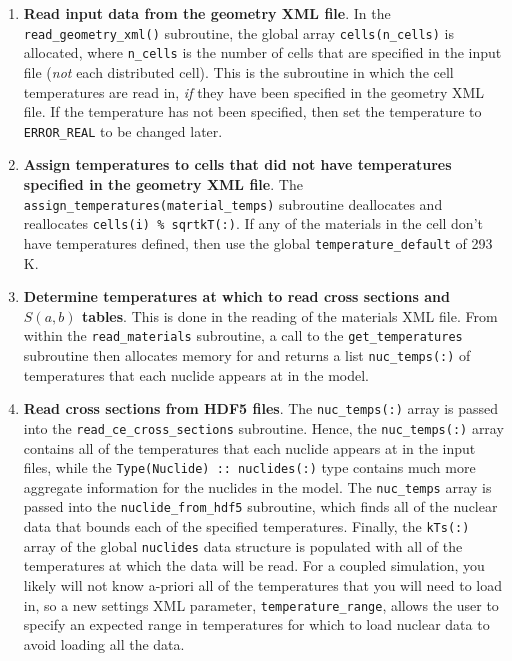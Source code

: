 \documentclass[10pt]{article}
\numberwithin{equation}{section} %
\begin{document}
\begin{enumerate}
\item {\bf Read input data from the geometry XML file}. In the {\tt read\_geometry\_xml()} subroutine, the global array {\tt cells(n\_cells)} is allocated, where {\tt n\_cells} is the number of cells that are specified in the input file ({\it not} each distributed cell). This is the subroutine in which the cell temperatures are read in, {\it if} they have been specified in the geometry XML file. If the temperature has not been specified, then set the temperature to {\tt ERROR\_REAL} to be changed later. 

\begin{algorithm}[H]
\end{algorithm}

\item {\bf Assign temperatures to cells that did not have temperatures specified in the geometry XML file}. The {\tt assign\_temperatures(material\_temps)} subroutine deallocates and reallocates {\tt cells(i) \% sqrtkT(:)}. If any of the materials in the cell don't have temperatures defined, then use the global {\tt temperature\_default} of 293 K.

\item {\bf Determine temperatures at which to read cross sections and \(S(a,b)\) tables}. This is done in the reading of the materials XML file. From within the {\tt read\_materials} subroutine, a call to the {\tt get\_temperatures} subroutine then allocates memory for and returns a list {\tt nuc\_temps(:)} of temperatures that each nuclide appears at in the model. 

\item {\bf Read cross sections from HDF5 files}. The {\tt nuc\_temps(:)} array is passed into the {\tt read\_ce\_cross\_sections} subroutine. Hence, the {\tt nuc\_temps(:)} array contains all of the temperatures that each nuclide appears at in the input files, while the {\tt Type(Nuclide) :: nuclides(:)} type contains much more aggregate information for the nuclides in the model. The {\tt nuc\_temps} array is passed into the {\tt nuclide\_from\_hdf5} subroutine, which finds all of the nuclear data that bounds each of the specified temperatures. Finally, the {\tt kTs(:)} array of the global {\tt nuclides} data structure is populated with all of the temperatures at which the data will be read. For a coupled simulation, you likely will not know a-priori all of the temperatures that you will need to load in, so a new settings XML parameter, {\tt temperature\_range}, allows the user to specify an expected range in temperatures for which to load nuclear data to avoid loading all the data.
\end{enumerate}
\end{document}
